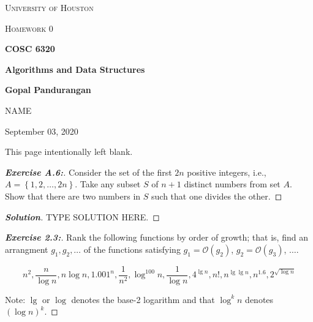 \documentclass[a4paper]{article}
\newenvironment{solution}{\begin{proof}[\textnormal{\textbf{Solution}}]}{\end{proof}}
\newenvironment{exercise}[1]{\begin{proof}[\textnormal{\textbf{Exercise #1:}}]\renewcommand{\qedsymbol}{}}{\end{proof}}
\newcommand{\bigO}[1]{\mathcal{O}\left(#1\right)}
\newcommand{\set}[1]{\left\lbrace#1\right\rbrace}
\begin{document}
\begin{titlepage}
    \centering
    {\scshape\LARGE University of Houston\par}
    \vspace{1cm}
    {\scshape\Large Homework 0 \par}
    \vspace{1.5cm}
    {\huge\bfseries COSC 6320 \par}
    {\huge\bfseries Algorithms and Data Structures \par}
    \vspace{0.5cm}
    {\large\bfseries Gopal Pandurangan\par}
    \vspace{2cm}
    {\Large NAME\par}
    \vspace{0.5cm}
    {\large \par} September 03, 2020
    \vfill

\end{titlepage}
\vspace*{\fill}\begin{center}{\Huge This page intentionally left blank.}\end{center}\vspace*{\fill}\thispagestyle{empty}\clearpage
{}

\begin{exercise}{A.6}
    Consider the set of the first \(2n\) positive integers, i.e., \(A = \set{1, 2, \hdots, 2n}\). Take any subset \(S\) of \(n + 1\) distinct numbers from set \(A\). Show that there are two numbers in \(S\) such that one divides the other.
\end{exercise}

\begin{solution}
    TYPE SOLUTION HERE.
\end{solution}

\begin{exercise}{2.3}
    Rank the following functions by order of growth; that is, find an arrangment \(g_1, g_2, \hdots\) of the functions satisfying \(g_1 = \bigO{g_2}\), \(g_2 = \bigO{g_3}\), \(\hdots\).

    \[n^2, \frac{n}{\log{n}}, n\log{n}, 1.001^n, \frac{1}{n^2}, \log^{100}{n}, \frac{1}{\log{n}}, 4^{\lg{n}}, n!, n^{\lg{\lg{n}}}, n^{1.6}, 2^{\sqrt{\log{n}}}\]

    Note: \(\lg\) or \(\log\) denotes the base-2 logarithm and that \(\log^k{n}\) denotes \((\log{n})^k\).
\end{exercise}
\end{document}
